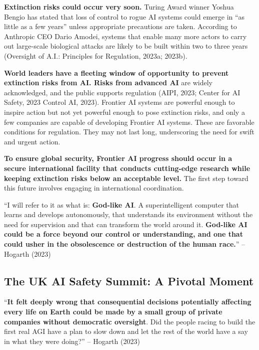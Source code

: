 \documentclass[12pt,a4paper]{article}
\begin{document}
\textbf{Extinction risks could occur very soon.} Turing Award winner Yoshua Bengio has stated that loss of control to rogue AI systems could emerge in “as little as a few years” unless appropriate precautions are taken. According to Anthropic CEO Dario Amodei, systems that enable many more actors to carry out large-scale biological attacks are likely to be built within two to three years (Oversight of A.I.: Principles for Regulation, 2023a; 2023b).

\textbf{World leaders have a fleeting window of opportunity to prevent extinction risks from AI. Risks from advanced AI} are widely acknowledged, and the public supports regulation (AIPI, 2023; Center for AI Safety, 2023 Control AI, 2023). Frontier AI systems are powerful enough to inspire action but not yet powerful enough to pose extinction risks, and only a few companies are capable of developing Frontier AI systems. These are favorable conditions for regulation. They may not last long, underscoring the need for swift and urgent action.

\textbf{To ensure global security, Frontier AI progress should occur in a secure international facility that conducts cutting-edge research while keeping extinction risks below an acceptable level.} The first step toward this future involves engaging in international coordination. 

\hfill\begin{minipage}{\dimexpr\textwidth-1cm}
“I will refer to it as what is: \textbf{God-like AI}. A superintelligent computer that learns and develops autonomously, that understands its environment without the need for supervision and that can transform the world around it. \textbf{God-like AI could be a force beyond our control or understanding, and one that could usher in the obsolescence or destruction of the human race.}” – Hogarth (2023)
\end{minipage}


\subsection{The UK AI Safety Summit: A Pivotal Moment }\label{sec:methods}
\hfill\begin{minipage}{\dimexpr\textwidth-1cm}
“\textbf{It felt deeply wrong that consequential decisions potentially affecting every life on Earth could be made by a small group of private companies without democratic oversight}. Did the people racing to build the first real AGI have a plan to slow down and let the rest of the world have a say in what they were doing?” – Hogarth (2023)
\end{minipage}
\hspace{1cm}
\end{document}
